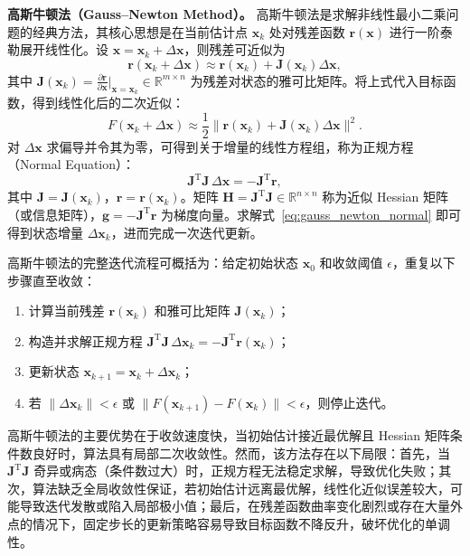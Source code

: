 \textbf{高斯牛顿法（Gauss--Newton Method）。}
高斯牛顿法是求解非线性最小二乘问题的经典方法，其核心思想是在当前估计点 $\mathbf{x}_k$ 处对残差函数 $\mathbf{r}(\mathbf{x})$ 进行一阶泰勒展开线性化。设 $\mathbf{x}=\mathbf{x}_k+\Delta\mathbf{x}$，则残差可近似为
\begin{equation}
\mathbf{r}(\mathbf{x}_k+\Delta\mathbf{x}) \approx \mathbf{r}(\mathbf{x}_k) + \mathbf{J}(\mathbf{x}_k)\Delta\mathbf{x},
\end{equation}
其中 $\mathbf{J}(\mathbf{x}_k)=\frac{\partial \mathbf{r}}{\partial \mathbf{x}}\big|_{\mathbf{x}=\mathbf{x}_k}\in\mathbb{R}^{m\times n}$ 为残差对状态的雅可比矩阵。将上式代入目标函数，得到线性化后的二次近似：
\begin{equation}
F(\mathbf{x}_k+\Delta\mathbf{x}) \approx \frac{1}{2}\|\mathbf{r}(\mathbf{x}_k)+\mathbf{J}(\mathbf{x}_k)\Delta\mathbf{x}\|^2.
\end{equation}
对 $\Delta\mathbf{x}$ 求偏导并令其为零，可得到关于增量的线性方程组，称为正规方程（Normal Equation）：
\begin{equation}
\mathbf{J}^{\mathrm{T}}\mathbf{J}\,\Delta\mathbf{x} = -\mathbf{J}^{\mathrm{T}}\mathbf{r},
\label{eq:gauss_newton_normal}
\end{equation}
其中 $\mathbf{J}=\mathbf{J}(\mathbf{x}_k)$，$\mathbf{r}=\mathbf{r}(\mathbf{x}_k)$。矩阵 $\mathbf{H}=\mathbf{J}^{\mathrm{T}}\mathbf{J}\in\mathbb{R}^{n\times n}$ 称为近似 Hessian 矩阵（或信息矩阵），$\mathbf{g}=-\mathbf{J}^{\mathrm{T}}\mathbf{r}$ 为梯度向量。求解式~\eqref{eq:gauss_newton_normal} 即可得到状态增量 $\Delta\mathbf{x}_k$，进而完成一次迭代更新。

高斯牛顿法的完整迭代流程可概括为：给定初始状态 $\mathbf{x}_0$ 和收敛阈值 $\epsilon$，重复以下步骤直至收敛：
\begin{enumerate}
    \item 计算当前残差 $\mathbf{r}(\mathbf{x}_k)$ 和雅可比矩阵 $\mathbf{J}(\mathbf{x}_k)$；
    \item 构造并求解正规方程 $\mathbf{J}^{\mathrm{T}}\mathbf{J}\,\Delta\mathbf{x}_k = -\mathbf{J}^{\mathrm{T}}\mathbf{r}(\mathbf{x}_k)$；
    \item 更新状态 $\mathbf{x}_{k+1} = \mathbf{x}_k + \Delta\mathbf{x}_k$；
    \item 若 $\|\Delta\mathbf{x}_k\|<\epsilon$ 或 $\|F(\mathbf{x}_{k+1})-F(\mathbf{x}_k)\|<\epsilon$，则停止迭代。
\end{enumerate}

高斯牛顿法的主要优势在于收敛速度快，当初始估计接近最优解且 Hessian 矩阵条件数良好时，算法具有局部二次收敛性。然而，该方法存在以下局限：首先，当 $\mathbf{J}^{\mathrm{T}}\mathbf{J}$ 奇异或病态（条件数过大）时，正规方程无法稳定求解，导致优化失败；其次，算法缺乏全局收敛性保证，若初始估计远离最优解，线性化近似误差较大，可能导致迭代发散或陷入局部极小值；最后，在残差函数曲率变化剧烈或存在大量外点的情况下，固定步长的更新策略容易导致目标函数不降反升，破坏优化的单调性。


